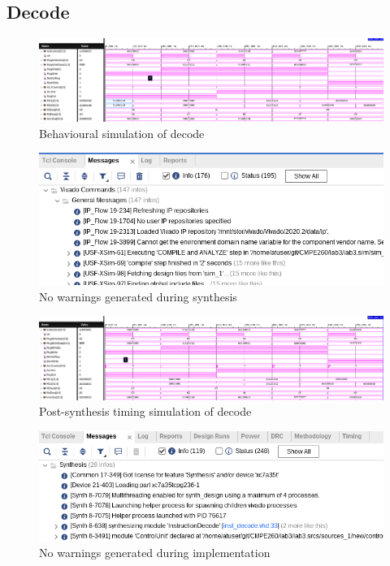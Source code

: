 \documentclass[CMPE]{../KGCOEReport}
\begin{document}
	\pagebreak
	
    \subsection*{Decode}
    \begin{figure}[h!]
        \centering
        \includegraphics[width=\textwidth]{img/behavior_decode}
        \caption{Behavioural simulation of decode}
        \label{fig:demo1}
	\end{figure}
    \begin{figure}[h!]
        \centering
        \includegraphics[width=\textwidth]{img/warning_synth_decode}
        \caption{No warnings generated during synthesis}
        \label{fig:demo1}
	\end{figure}
    \begin{figure}[h!]
        \centering
        \includegraphics[width=\textwidth]{img/synthesis_decode}
        \caption{Post-synthesis timing simulation of decode}
        \label{fig:demo1}
	\end{figure}
    \begin{figure}[h!]
        \centering
        \includegraphics[width=\textwidth]{img/warning_impl_decode}
        \caption{No warnings generated during implementation}
        \label{fig:demo1}
	\end{figure}
\end{document}
